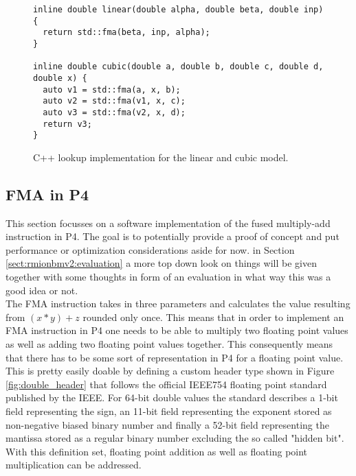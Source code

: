 \captionsetup[figure]{skip=-10pt} %
\begin{figure}[ht]
  \begin{lstlisting}[style=C++, basicstyle=\ttfamily]
inline double linear(double alpha, double beta, double inp) {
  return std::fma(beta, inp, alpha);
}

inline double cubic(double a, double b, double c, double d, double x) {
  auto v1 = std::fma(a, x, b);
  auto v2 = std::fma(v1, x, c);
  auto v3 = std::fma(v2, x, d);
  return v3;
}\end{lstlisting}
  \caption[Linear and Cubic lookup implementation in C++]{ C++ lookup implementation for the linear and cubic model. }
  \label{fig:linear_cubic}
\end{figure}

\subsection{FMA in P4}
\label{sect:rmionbmv2:fma}
This section focusses on a software implementation of the fused multiply-add instruction in P4. The goal is to potentially provide a proof of concept and put performance or optimization considerations aside for now. in Section \ref{sect:rmionbmv2:evaluation} a more top down look on things will be given together with some thoughts in form of an evaluation in what way this was a good idea or not.\\

The FMA instruction takes in three parameters and calculates the value resulting from \((x * y) + z\) rounded only once. This means that in order to implement an FMA instruction in P4 one needs to be able to multiply two floating point values as well as adding two floating point values together. This consequently means that there has to be some sort of representation in P4 for a floating point value. This is pretty easily doable by defining a custom header type shown in Figure \ref{fig:double_header} that follows the official IEEE754 floating point standard \cite{ieee754} published by the IEEE. For 64-bit double values the standard describes a 1-bit field representing the sign, an 11-bit field representing the exponent stored as non-negative biased binary number and finally a 52-bit field representing the mantissa stored as a regular binary number excluding the so called "hidden bit". With this definition set, floating point addition as well as floating point multiplication can be addressed.\\

